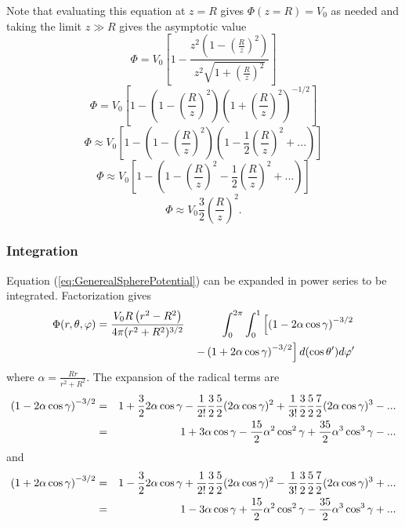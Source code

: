 Note that evaluating this equation at $z=R$ gives $\Phi(z=R)= V_0$ as needed and taking the limit $z \gg R$ gives the asymptotic value 
\begin{equation}
\Phi = V_0 \left[ 1 - \frac{z^2 \left(1- \left( \frac{R}{z} \right)^2 \right) }{z^2 \sqrt{1 + \left( \frac{R}{z} \right)^2} } \right]  
\end{equation}
\begin{equation}
\Phi = V_0 \left[ 1 -  \left(1- \left( \frac{R}{z} \right)^2 \right) \left( 1 + \left( \frac{R}{z} \right)^2 \right)^{-1/2} \right]  
\end{equation}
\begin{equation}
\Phi \approx V_0 \left[ 1 -  \left(1- \left( \frac{R}{z} \right)^2 \right) \left( 1 - \frac{1}{2}\left( \frac{R}{z} \right)^2 + ... \right) \right]  
\end{equation}
\begin{equation}
\Phi \approx V_0 \left[ 1 -  \left(1- \left( \frac{R}{z} \right)^2 - \frac{1}{2}\left( \frac{R}{z} \right)^2 + ... \right) \right]  
\end{equation}
\begin{equation}
\Phi \approx V_0  \frac{3}{2}\left( \frac{R}{z} \right)^2 .
\end{equation}

\subsubsection{Integration}

Equation (\ref{eq:GenerealSpherePotential}) can be expanded in power series to be integrated. Factorization gives
\begin{eqnarray}
\Phi (r, \theta, \varphi ) &= \frac{V_0 R \left(  r^2- R^2 \right)}{4 \pi (r^2 + R^2)^{3/2}}   & \int_0^{2\pi}  \int_0^1   \left[ \left( 1- 2 \alpha \cos \gamma \right)^{-3/2}  \right. \notag \\ 
& & \left. -  \left(1+ 2 \alpha \cos \gamma \right)^{-3/2}  \right]d(\cos \theta ')  d \varphi ' 
\end{eqnarray}
where $\alpha = \frac{Rr}{r^2 + R^2}$. The expansion of the radical terms are
\begin{eqnarray}
\left( 1- 2 \alpha \cos \gamma \right)^{-3/2} &=& 1 + \frac{3}{2} 2 \alpha \cos \gamma - \frac{1}{2!} \frac{3}{2} \frac{5}{2} (2 \alpha \cos \gamma)^2 + \frac{1}{3!} \frac{3}{2} \frac{5}{2} \frac{7}{2} (2 \alpha \cos \gamma)^3 - ... \notag \\
&=& 1 + 3 \alpha \cos \gamma -  \frac{15}{2}  \alpha ^2 \cos ^2  \gamma  +   \frac{35}{2}  \alpha ^3 \cos ^3 \gamma - ...
\end{eqnarray}
and
\begin{eqnarray}
\left( 1+ 2 \alpha \cos \gamma \right)^{-3/2} &=& 1 - \frac{3}{2} 2 \alpha \cos \gamma + \frac{1}{2!} \frac{3}{2} \frac{5}{2} (2 \alpha \cos \gamma)^2 - \frac{1}{3!} \frac{3}{2} \frac{5}{2} \frac{7}{2} (2 \alpha \cos \gamma)^3 + ... \notag \\
&=& 1 - 3 \alpha \cos \gamma +  \frac{15}{2}  \alpha ^2 \cos ^2  \gamma  -   \frac{35}{2}  \alpha ^3 \cos ^3 \gamma + ...
\end{eqnarray}

